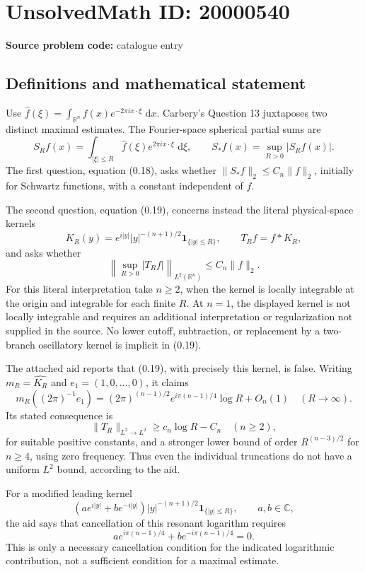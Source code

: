 \documentclass[11pt]{article}
\newcommand{\R}{\mathbb{R}}
\newcommand{\C}{\mathbb{C}}
\newcommand{\dd}{\,\mathrm{d}}
\begin{document}
\section*{UnsolvedMath ID: 20000540}
\textbf{Source problem code:} catalogue entry
\subsection{Definitions and mathematical statement}
Use \(\widehat f(\xi)=\int_{\R^n}f(x)e^{-2\pi i x\cdot\xi}\,\dd x\). Carbery's Question 13 juxtaposes two distinct maximal estimates. The Fourier-space spherical partial sums are
\[
S_Rf(x)=\int_{|\xi|\leq R}\widehat f(\xi)e^{2\pi i x\cdot\xi}\,\dd\xi,
\qquad S_*f(x)=\sup_{R>0}|S_Rf(x)|.
\]
The first question, equation (0.18), asks whether \(\|S_*f\|_2\leq C_n\|f\|_2\), initially for Schwartz functions, with a constant independent of \(f\).

The second question, equation (0.19), concerns instead the literal physical-space kernels
\[
K_R(y)=e^{i|y|}|y|^{-(n+1)/2}\mathbf1_{\{|y|\leq R\}},\qquad
T_Rf=f*K_R,
\]
and asks whether
\[
\left\|\sup_{R>0}|T_Rf|\right\|_{L^2(\R^n)}\leq C_n\|f\|_2.
\]
For this literal interpretation take \(n\geq2\), when the kernel is locally integrable at the origin and integrable for each finite \(R\). At \(n=1\), the displayed kernel is not locally integrable and requires an additional interpretation or regularization not supplied in the source. No lower cutoff, subtraction, or replacement by a two-branch oscillatory kernel is implicit in (0.19).

The attached aid reports that (0.19), with precisely this kernel, is false. Writing \(m_R=\widehat{K_R}\) and \(e_1=(1,0,\ldots,0)\), it claims
\[
m_R((2\pi)^{-1}e_1)
=(2\pi)^{(n-1)/2}e^{i\pi(n-1)/4}\log R+O_n(1)
\quad(R\to\infty).
\]
Its stated consequence is
\[
\|T_R\|_{L^2\to L^2}\geq c_n\log R-C_n\quad(n\geq2),
\]
for suitable positive constants, and a stronger lower bound of order
\(R^{(n-3)/2}\) for \(n\geq4\), using zero frequency. Thus even the individual truncations do not have a uniform \(L^2\) bound, according to the aid.

For a modified leading kernel
\[
(ae^{i|y|}+be^{-i|y|})|y|^{-(n+1)/2}\mathbf1_{\{|y|\leq R\}},\qquad a,b\in\C,
\]
the aid says that cancellation of this resonant logarithm requires
\[
ae^{i\pi(n-1)/4}+be^{-i\pi(n-1)/4}=0.
\]
This is only a necessary cancellation condition for the indicated logarithmic contribution, not a sufficient condition for a maximal estimate.
\end{document}
